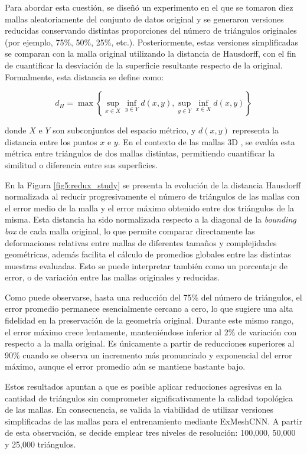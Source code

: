 Para abordar esta cuestión, se diseñó un experimento en el que se tomaron diez mallas aleatoriamente del conjunto de datos original y se generaron versiones reducidas conservando distintas proporciones del número de triángulos originales (por ejemplo, 75\%, 50\%, 25\%, etc.). Posteriormente, estas versiones simplificadas se comparan con la malla original utilizando la distancia de Hausdorff, con el fin de cuantificar la desviación de la superficie resultante respecto de la original. Formalmente, esta distancia se define como:

\begin{equation}
d_H = \max\left\{\sup_{x\in X} \inf_{y \in Y} d(x,y), \sup_{y\in Y} \inf_{x \in X} d(x,y) \right\}
\end{equation}

donde $X$ e $Y$ son subconjuntos del espacio métrico, y $d(x,y)$ representa la distancia entre los puntos $x$ e $y$. En el contexto de las mallas 3D \cite{cignoni1998metro}, se evalúa esta métrica entre triángulos de dos mallas distintas, permitiendo cuantificar la similitud o diferencia entre sus superficies.

En la Figura \ref{fig5:redux_study} se presenta la evolución de la distancia Hausdorff normalizada al reducir progresivamente el número de triángulos de las mallas con el error medio de la malla y el error máximo obtenido entre dos triángulos de la misma. Esta distancia ha sido normalizada respecto a la diagonal de la \textit{bounding box} de cada malla original, lo que permite comparar directamente las deformaciones relativas entre mallas de diferentes tamaños y complejidades geométricas, además facilita el cálculo de promedios globales entre las distintas muestras evaluadas. Esto se puede interpretar también como un porcentaje de error, o de variación entre las mallas originales y reducidas.

Como puede observarse, hasta una reducción del 75\% del número de triángulos, el error promedio permanece esencialmente cercano a cero, lo que sugiere una alta fidelidad en la preservación de la geometría original. Durante este mismo rango, el error máximo crece lentamente, manteniéndose inferior al 2\% de variación con respecto a la malla original. Es únicamente a partir de reducciones superiores al 90\% cuando se observa un incremento más pronunciado y exponencial del error máximo, aunque el error promedio aún se mantiene bastante bajo.

Estos resultados apuntan a que es posible aplicar reducciones agresivas en la cantidad de triángulos sin comprometer significativamente la calidad topológica de las mallas. En consecuencia, se valida la viabilidad de utilizar versiones simplificadas de las mallas para el entrenamiento mediante ExMeshCNN. A partir de esta observación, se decide emplear tres niveles de resolución: 100,000, 50,000 y 25,000 triángulos.

